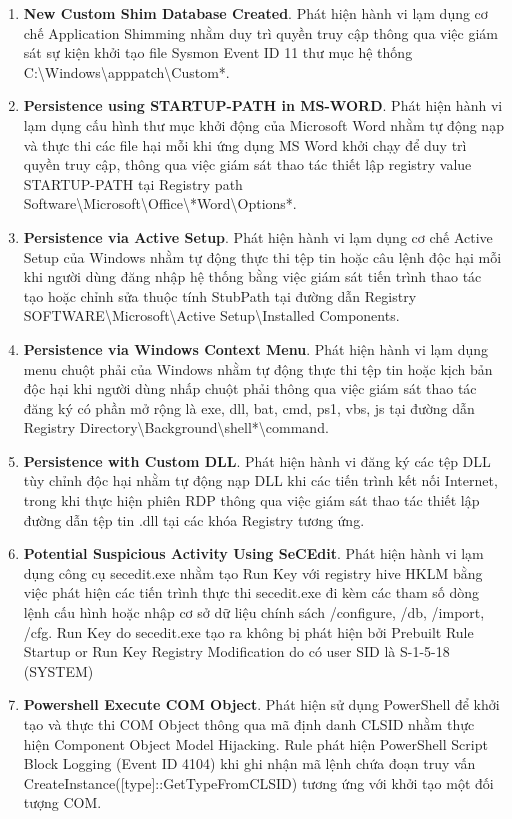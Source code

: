 \begin{enumerate}
\item \textbf{New Custom Shim Database Created}. Phát hiện hành vi lạm dụng cơ chế Application Shimming nhằm duy trì quyền truy cập thông qua việc giám sát sự kiện khởi tạo file Sysmon Event ID 11 thư mục hệ thống C:\textbackslash{}Windows\textbackslash{}apppatch\textbackslash{}Custom*.
\item \textbf{Persistence using STARTUP-PATH in MS-WORD}. Phát hiện hành vi lạm dụng cấu hình thư mục khởi động của Microsoft Word nhằm tự động nạp và thực thi các file hại mỗi khi ứng dụng MS Word khởi chạy để duy trì quyền truy cập, thông qua việc giám sát thao tác thiết lập registry value STARTUP-PATH tại Registry path Software\textbackslash{}Microsoft\textbackslash{}Office\textbackslash{}*Word\textbackslash{}Options*.
\item \textbf{Persistence via Active Setup}. Phát hiện hành vi lạm dụng cơ chế Active Setup của Windows nhằm tự động thực thi tệp tin hoặc câu lệnh độc hại mỗi khi người dùng đăng nhập hệ thống bằng việc giám sát tiến trình thao tác tạo hoặc chỉnh sửa thuộc tính StubPath tại đường dẫn Registry SOFTWARE\textbackslash{}Microsoft\textbackslash{}Active Setup\textbackslash{}Installed Components.
\item \textbf{Persistence via Windows Context Menu}. Phát hiện hành vi lạm dụng menu chuột phải của Windows nhằm tự động thực thi tệp tin hoặc kịch bản độc hại khi người dùng nhấp chuột phải thông qua việc giám sát thao tác đăng ký có phần mở rộng là exe, dll, bat, cmd, ps1, vbs, js tại đường dẫn Registry Directory\textbackslash{}Background\textbackslash{}shell*\textbackslash{}command.
\item \textbf{Persistence with Custom DLL}. Phát hiện hành vi đăng ký các tệp DLL tùy chỉnh độc hại nhằm tự động nạp DLL khi các tiến trình kết nối Internet, trong khi thực hiện phiên RDP thông qua việc giám sát thao tác thiết lập đường dẫn tệp tin .dll tại các khóa Registry tương ứng.
\item \textbf{Potential Suspicious Activity Using SeCEdit}. Phát hiện hành vi lạm dụng công cụ secedit.exe nhằm tạo Run Key với registry hive HKLM bằng việc phát hiện các tiến trình thực thi secedit.exe đi kèm các tham số dòng lệnh cấu hình hoặc nhập cơ sở dữ liệu chính sách /configure, /db, /import, /cfg. Run Key do secedit.exe tạo ra không bị phát hiện bởi Prebuilt Rule Startup or Run Key Registry Modification do có user SID là S-1-5-18 (SYSTEM)
\item \textbf{Powershell Execute COM Object}. Phát hiện sử dụng PowerShell để khởi tạo và thực thi COM Object thông qua mã định danh CLSID nhằm thực hiện Component Object Model Hijacking. Rule phát hiện PowerShell Script Block Logging (Event ID 4104) khi ghi nhận mã lệnh chứa đoạn truy vấn CreateInstance([type]::GetTypeFromCLSID) tương ứng với khởi tạo một đối tượng COM.

\end{enumerate}
